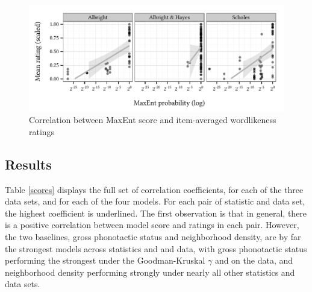 \begin{figure}
\centering
\includegraphics{maxent.pdf}
\caption{Correlation between MaxEnt score and item-averaged wordlikeness ratings}
\label{maxent}
\end{figure}

\subsection{Results}

Table \ref{scores} displays the full set of correlation coefficients, for each of the three data sets, and for each of the four models. For each pair of statistic and data set, the highest coefficient is underlined. The first observation is that in general, there is a positive correlation between model score and ratings in each pair. However, the two baselines, gross phonotactic status and neighborhood density, are by far the strongest models across statistics and and data, with gross phonotactic status performing the strongest under the Goodman-Kruskal $\gamma$ and on the \citet{Albright2007} data, and neighborhood density performing strongly under nearly all other statistics and data sets. 

